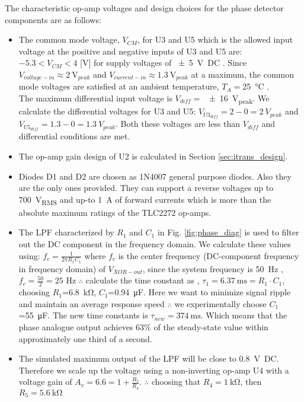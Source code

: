The characteristic op-amp voltages and design choices for the phase detector components are as follows:
\begin{itemize}
     \item The common mode voltage, $V_{CM}$, for U3 and U5 which is the allowed input voltage at the positive and negative inputs of U3 and U5 are: \\$-5.3<V_{CM}<4$ [V] for supply voltages of \SI{+-5}{\volt DC} \cite{TLC2272}. Since $V_{voltage-in}\approx \SI{2}{\volt_{peak}}$ and $V_{current-in}\approx \SI{1.3}{\volt_{peak}}$ at a maximum, the common mode voltages are satisfied at an ambient temperature, $T_A=$\SI{25}{\degreeCelsius} \cite{TLC2272}.\\The maximum differential input voltage is $V_{diff}=$ \SI{+-16}{V_{peak}}. We calculate the differential voltages for U3 and U5: $V_{U3_{diff}}=2-0=\SI{2}{V_{peak}}$ and $V_{U5_{diff}}=1.3-0=\SI{1.3}{V_{peak}}$. Both these voltages are less than $V_{diff}$ and differential conditions are met.
     \item The op-amp gain design of U2 is calculated in Section \ref{sec:itrans_design}.
     \item Diodes D1 and D2 are chosen as 1N4007 general purpose diodes. Also they are the only ones provided. They can support a reverse voltages up to \SI{700}{V_{RMS}} and up-to \SI{1}{\ampere} of forward currents \cite{1N4007} which is more than the absolute maximum ratings of the TLC2272 op-amps\cite{TLC2272}.
     \item The LPF characterized by $R_1$ and $C_1$ in Fig. \ref{fig:phase_diag} is used to filter out the DC component in the frequency domain.
     We calculate these values using: $f_c=\frac{1}{2 \pi R_1 C_1}$ \cite{DC_Analogue} where $f_c$ is the center frequency (DC-component frequency in frequency domain) of $V_{XOR-out}$, since the system frequency is \SI{50}{\hertz} \cite{DC_Analogue}, \\$f_c=\frac{50}{2}=25$ Hz $\therefore$ calculate the time constant as , $\tau_{1}=\SI{6.37}{\milli\second}=R_1 \cdot C_1$, choosing $R_1$=\SI{6.8}{\kilo\ohm}, $C_1$=\SI{0.94}{\micro\farad}. Here we want to minimize  signal ripple and maintain an average response speed $\therefore$ we experimentally choose $C_1$=\SI{55}{\micro\farad}. The new time constants is $\tau_{new}=\SI{374}{\milli\second}$. Which means that the phase analogue output achieves 63\% of the steady-state value within approximately one third of a second.
     \item The simulated maximum output of the LPF will be close to \SI{0.8}{\volt DC}. Therefore we scale up the voltage using a non-inverting op-amp U4 with a voltage gain of  $A_v=6.6=1+\frac{R_5}{R_4}$. $\therefore$ choosing that $R_4=\SI{1}{\kilo\ohm}$, then $R_5=\SI{5.6}{\kilo\ohm}$
\end{itemize}

